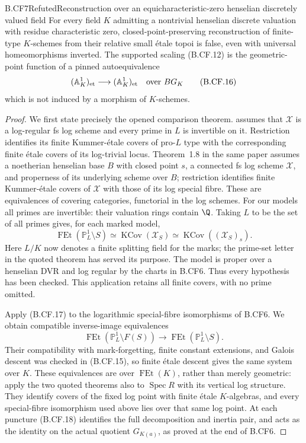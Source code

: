 \begin{claim}{B.CF7}{Refuted}{Reconstruction over an equicharacteristic-zero henselian discretely valued field}
For every field \(K\) admitting a nontrivial henselian discrete
valuation with residue characteristic zero, closed-point-preserving
reconstruction of finite-type \(K\)-schemes from their relative
small étale topoi is false, even with universal homeomorphisms
inverted. The supported scaling (B.CF.12) is the geometric-point
function of a pinned autoequivalence
\[
          (\mathbb A^1_K)_{\mathrm{et}}
             \longrightarrow(\mathbb A^1_K)_{\mathrm{et}}
                  \quad\hbox{over }BG_K                 \tag{B.CF.16}
\]
which is not induced by a morphism of \(K\)-schemes.
\end{claim}
\begin{proof}
We first state precisely the opened comparison theorem.
\citep[Theorem~1.6]{Lepage2013} assumes that \(\mathscr X\) is a
log-regular fs log scheme and every prime in \(L\) is invertible
on it. Restriction identifies its finite Kummer-étale covers of
pro-\(L\) type with the corresponding finite étale covers of its
log-trivial locus. Theorem~1.8 in the same paper assumes a
noetherian henselian base \(B\) with closed point \(s\), a
connected fs log scheme \(\mathscr X\), and properness of its
underlying scheme over \(B\); restriction identifies finite
Kummer-étale covers of \(\mathscr X\) with those of its log
special fibre. These are equivalences of covering categories,
functorial in the log schemes. For our models all primes are
invertible: their valuation rings contain \(\Q\). Taking
\(L\) to be the set of all primes gives, for each marked model,
\[
 \operatorname{FEt}(\mathbb P^1_L\setminus S)
       \simeq\operatorname{KCov}(\mathscr X_S)
       \simeq\operatorname{KCov}((\mathscr X_S)_s).
                                                        \tag{B.CF.17}
\]
Here \(L/K\) now denotes a finite splitting field for the marks;
the prime-set letter in the quoted theorem has served its purpose.
The model is proper over a henselian DVR and log regular by the
charts in B.CF6. Thus every hypothesis has been checked. This
application retains all finite covers, with no prime omitted.

Apply (B.CF.17) to the logarithmic special-fibre isomorphisms of
B.CF6. We obtain compatible inverse-image equivalences
\[
 \operatorname{FEt}(\mathbb P^1_L\setminus F(S))
           \longrightarrow
 \operatorname{FEt}(\mathbb P^1_L\setminus S).            \tag{B.CF.18}
\]
Their compatibility with mark-forgetting, finite constant
extensions, and Galois descent was checked in (B.CF.15), so
finite étale descent gives the same system over \(K\).
These equivalences are over \(\operatorname{FEt}(K)\), rather
than merely geometric: apply the two quoted theorems also to
\(\operatorname{Spec}R\) with its vertical log structure.
They identify covers of the fixed log point with finite étale
\(K\)-algebras, and every special-fibre isomorphism used above
lies over that same log point. At each puncture (B.CF.18)
identifies the full decomposition and inertia pair, and acts as
the identity on the actual quotient \(G_{K(a)}\), as proved
at the end of B.CF6.


\end{proof}
